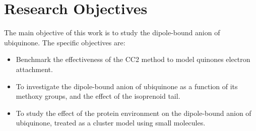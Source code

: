 \section{Research Objectives}
The main objective of this work is to study the dipole-bound anion of ubiquinone. The specific objectives are:
\begin{itemize}
  \item Benchmark the effectiveness of the CC2 method to model quinones electron attachment.
  \item To investigate the dipole-bound anion of ubiquinone as a function of its methoxy groups, and the effect of the isoprenoid tail.
  \item To study the effect of the protein environment on the dipole-bound anion of ubiquinone, treated as a cluster model using small molecules.
\end{itemize}

\cleardoublepage

